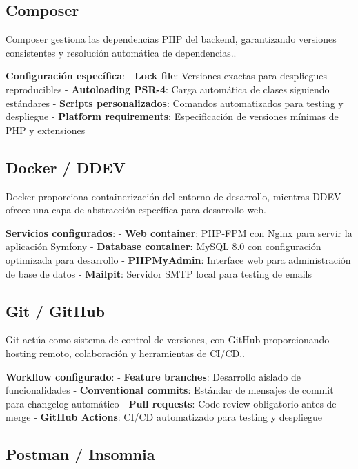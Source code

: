 \documentclass[12pt,a4paper,oneside]{report}
\begin{document}
\subsection{Composer}\label{composer}

Composer gestiona las dependencias PHP del backend, garantizando
versiones consistentes y resolución automática de dependencias..

\textbf{Configuración específica}: - \textbf{Lock file}: Versiones
exactas para despliegues reproducibles - \textbf{Autoloading PSR-4}:
Carga automática de clases siguiendo estándares - \textbf{Scripts
personalizados}: Comandos automatizados para testing y despliegue -
\textbf{Platform requirements}: Especificación de versiones mínimas de
PHP y extensiones

\subsection{Docker / DDEV}\label{docker-ddev}

Docker proporciona containerización del entorno de desarrollo, mientras
DDEV ofrece una capa de abstracción específica para desarrollo web.

\textbf{Servicios configurados}: - \textbf{Web container}: PHP-FPM con
Nginx para servir la aplicación Symfony - \textbf{Database container}:
MySQL 8.0 con configuración optimizada para desarrollo -
\textbf{PHPMyAdmin}: Interface web para administración de base de datos
- \textbf{Mailpit}: Servidor SMTP local para testing de emails

\subsection{Git / GitHub}\label{git-github}

Git actúa como sistema de control de versiones, con GitHub
proporcionando hosting remoto, colaboración y herramientas de CI/CD..

\textbf{Workflow configurado}: - \textbf{Feature branches}: Desarrollo
aislado de funcionalidades - \textbf{Conventional commits}: Estándar de
mensajes de commit para changelog automático - \textbf{Pull requests}:
Code review obligatorio antes de merge - \textbf{GitHub Actions}: CI/CD
automatizado para testing y despliegue

\subsection{Postman / Insomnia}\label{postman-insomnia}
\end{document}

